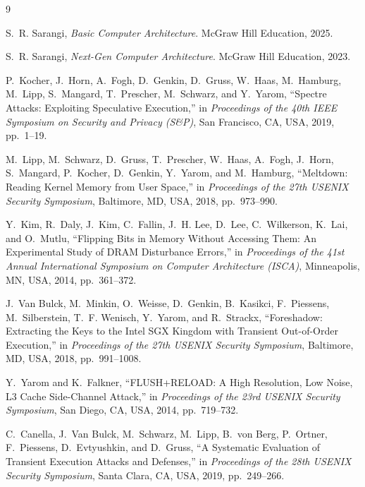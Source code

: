 \documentclass[11pt,a4paper]{article}
\begin{document}
\clearpage

\begin{thebibliography}{9}

S.~R. Sarangi, \textit{Basic Computer Architecture}. McGraw Hill Education, 2025.

S.~R. Sarangi, \textit{Next-Gen Computer Architecture}. McGraw Hill Education, 2023.

P.~Kocher, J.~Horn, A.~Fogh, D.~Genkin, D.~Gruss, W.~Haas, M.~Hamburg, M.~Lipp,
S.~Mangard, T.~Prescher, M.~Schwarz, and Y.~Yarom, ``Spectre Attacks: Exploiting
Speculative Execution,'' in \textit{Proceedings of the 40th IEEE Symposium on
Security and Privacy (S\&P)}, San Francisco, CA, USA, 2019, pp.~1--19.

M.~Lipp, M.~Schwarz, D.~Gruss, T.~Prescher, W.~Haas, A.~Fogh, J.~Horn,
S.~Mangard, P.~Kocher, D.~Genkin, Y.~Yarom, and M.~Hamburg, ``Meltdown: Reading
Kernel Memory from User Space,'' in \textit{Proceedings of the 27th USENIX
Security Symposium}, Baltimore, MD, USA, 2018, pp.~973--990.

Y.~Kim, R.~Daly, J.~Kim, C.~Fallin, J.~H. Lee, D.~Lee, C.~Wilkerson, K.~Lai,
and O.~Mutlu, ``Flipping Bits in Memory Without Accessing Them: An
Experimental Study of DRAM Disturbance Errors,'' in \textit{Proceedings of the
41st Annual International Symposium on Computer Architecture (ISCA)},
Minneapolis, MN, USA, 2014, pp.~361--372.

J.~Van Bulck, M.~Minkin, O.~Weisse, D.~Genkin, B.~Kasikci, F.~Piessens,
M.~Silberstein, T.~F. Wenisch, Y.~Yarom, and R.~Strackx, ``Foreshadow:
Extracting the Keys to the Intel SGX Kingdom with Transient Out-of-Order
Execution,'' in \textit{Proceedings of the 27th USENIX Security Symposium},
Baltimore, MD, USA, 2018, pp.~991--1008.

Y.~Yarom and K.~Falkner, ``FLUSH+RELOAD: A High Resolution, Low Noise, L3
Cache Side-Channel Attack,'' in \textit{Proceedings of the 23rd USENIX
Security Symposium}, San Diego, CA, USA, 2014, pp.~719--732.

C.~Canella, J.~Van Bulck, M.~Schwarz, M.~Lipp, B.~von Berg, P.~Ortner,
F.~Piessens, D.~Evtyushkin, and D.~Gruss, ``A Systematic Evaluation of
Transient Execution Attacks and Defenses,'' in \textit{Proceedings of the
28th USENIX Security Symposium}, Santa Clara, CA, USA, 2019, pp.~249--266.


\end{thebibliography}
\end{document}
